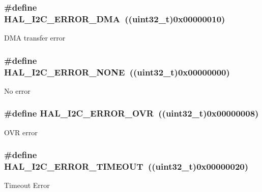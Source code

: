 \subsubsection[{\texorpdfstring{H\+A\+L\+\_\+\+I2\+C\+\_\+\+E\+R\+R\+O\+R\+\_\+\+D\+MA}{HAL_I2C_ERROR_DMA}}]{\setlength{\rightskip}{0pt plus 5cm}\#define H\+A\+L\+\_\+\+I2\+C\+\_\+\+E\+R\+R\+O\+R\+\_\+\+D\+MA~((uint32\+\_\+t)0x00000010)}\hypertarget{group___i2_c___error___code_gae1091e9e82dcfcfef247b214a11c9db3}{}\label{group___i2_c___error___code_gae1091e9e82dcfcfef247b214a11c9db3}
D\+MA transfer error 
\subsubsection[{\texorpdfstring{H\+A\+L\+\_\+\+I2\+C\+\_\+\+E\+R\+R\+O\+R\+\_\+\+N\+O\+NE}{HAL_I2C_ERROR_NONE}}]{\setlength{\rightskip}{0pt plus 5cm}\#define H\+A\+L\+\_\+\+I2\+C\+\_\+\+E\+R\+R\+O\+R\+\_\+\+N\+O\+NE~((uint32\+\_\+t)0x00000000)}\hypertarget{group___i2_c___error___code_ga0b8ca289091d942032c89484b6211d0d}{}\label{group___i2_c___error___code_ga0b8ca289091d942032c89484b6211d0d}
No error 
\subsubsection[{\texorpdfstring{H\+A\+L\+\_\+\+I2\+C\+\_\+\+E\+R\+R\+O\+R\+\_\+\+O\+VR}{HAL_I2C_ERROR_OVR}}]{\setlength{\rightskip}{0pt plus 5cm}\#define H\+A\+L\+\_\+\+I2\+C\+\_\+\+E\+R\+R\+O\+R\+\_\+\+O\+VR~((uint32\+\_\+t)0x00000008)}\hypertarget{group___i2_c___error___code_ga38d8f9beb4c681eba786f6154d4f594a}{}\label{group___i2_c___error___code_ga38d8f9beb4c681eba786f6154d4f594a}
O\+VR error 
\subsubsection[{\texorpdfstring{H\+A\+L\+\_\+\+I2\+C\+\_\+\+E\+R\+R\+O\+R\+\_\+\+T\+I\+M\+E\+O\+UT}{HAL_I2C_ERROR_TIMEOUT}}]{\setlength{\rightskip}{0pt plus 5cm}\#define H\+A\+L\+\_\+\+I2\+C\+\_\+\+E\+R\+R\+O\+R\+\_\+\+T\+I\+M\+E\+O\+UT~((uint32\+\_\+t)0x00000020)}\hypertarget{group___i2_c___error___code_gaeb3bedf36d78ddf3284a68494ab9d089}{}\label{group___i2_c___error___code_gaeb3bedf36d78ddf3284a68494ab9d089}
Timeout Error 